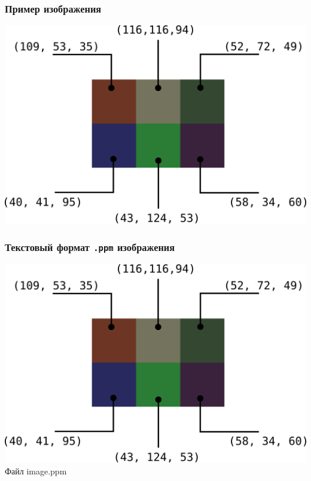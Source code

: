 \documentclass[10pt,pdf,hyperref={unicode}]{beamer}
\begin{document}
\begin{frame}[fragile]
\frametitle{Пример изображения} 
\begin{center}
\includegraphics[scale=0.65]{./images/tiny_new_wn.png}
\end{center}
\end{frame}




\begin{frame}[fragile]
\frametitle{Текстовый формат \texttt{.ppm} изображения} 
\begin{multicols}{2}
\includegraphics[scale=0.45]{./images/tiny_new_wn.png}
Файл image.ppm
\noindent{}
\end{multicols}
\end{frame}
\end{document}
